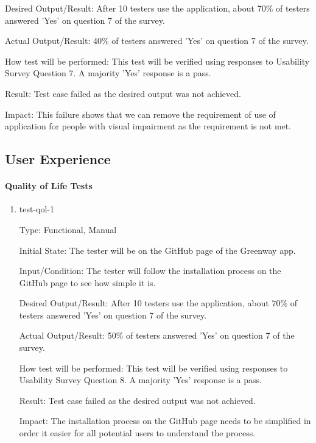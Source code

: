 \documentclass[12pt, titlepage]{article}
\begin{document}
\begin{enumerate}
Desired Output/Result: After 10 testers use the application, about 70\% of testers answered 'Yes' on question 7 of the survey.

Actual Output/Result: 40\% of testers answered 'Yes' on question 7 of the survey.

How test will be performed: This test will be verified using responses to Usability Survey Question 7. A majority 'Yes' response is a pass.

Result: Test case failed as the desired output was not achieved.

Impact: This failure shows that we can remove the requirement of use of application for people with visual impairment as the requirement is not met.

\end{enumerate}

\subsection{User Experience}

\paragraph{Quality of Life Tests}

\begin{enumerate}

\item{test-qol-1\\}

Type: Functional, Manual
					
Initial State: The tester will be on the GitHub page of the Greenway app.
					
Input/Condition: The tester will follow the installation process on the GitHub page to see how simple it is.
					
Desired Output/Result: After 10 testers use the application, about 70\% of testers answered 'Yes' on question 7 of the survey.

Actual Output/Result: 50\% of testers answered 'Yes' on question 7 of the survey.
					
How test will be performed: This test will be verified using responses to Usability Survey Question 8. A majority 'Yes' response is a pass.

Result: Test case failed as the desired output was not achieved.

Impact: The installation process on the GitHub page needs to be simplified in order it easier for all potential users to understand the process.

\end{enumerate}
\end{document}
